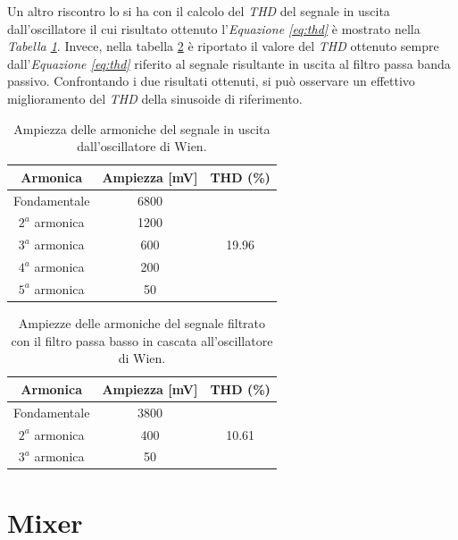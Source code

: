 \documentclass[titlepage]{report}
\begin{document}
	Un altro riscontro lo si ha con il calcolo del \textit{THD} del segnale in uscita dall'oscillatore il cui risultato ottenuto l'\textit{Equazione \ref{eq:thd}} è mostrato nella \textit{Tabella \ref{tab:THD_WIEN}}. Invece, nella tabella \ref{tab:THD_WIEN+LP} è riportato il valore del \textit{THD} ottenuto sempre dall'\textit{Equazione \ref{eq:thd}} riferito al segnale risultante in uscita al filtro passa banda passivo. 
	Confrontando i due risultati ottenuti, si può osservare un effettivo miglioramento del \textit{THD} della sinusoide di riferimento.

	\begin{table}[h!]
		\centering
		\begin{tabular}{||c|c|c||}
			\hline
			\cellcolor{gray!10}Armonica & \cellcolor{gray!10}Ampiezza [mV] & \cellcolor{gray!10}THD (\%) \\
			\hline
			Fondamentale & 6800 &\\
			\cline{1-2}
			$2^a$ armonica & 1200 & \\
			\cline{1-2} 
			$3^a$ armonica & 600 & 19.96 \\
			\cline{1-2} 
			$4^a$ armonica & 200 & \\
			\cline{1-2} 
			$5^a$ armonica & 50 & \\
			\hline	
		\end{tabular}
		\caption{Ampiezza delle armoniche del segnale in uscita dall'oscillatore di Wien.}
		\label{tab:THD_WIEN}
	\end{table}

	\begin{table}[h!]
		\centering
		\begin{tabular}{||c|c|c||}
			\hline
			\cellcolor{gray!10}Armonica & \cellcolor{gray!10}Ampiezza [mV] & \cellcolor{gray!10}THD (\%) \\
			\hline
			Fondamentale & 3800 &\\
			\cline{1-2}
			$2^a$ armonica & 400 & 10.61 \\
			\cline{1-2} 
			$3^a$ armonica & 50 & \\
			\hline	
		\end{tabular}
		\caption{Ampiezze delle armoniche del segnale filtrato con il filtro passa basso in cascata all'oscillatore di Wien.}
		\label{tab:THD_WIEN+LP}
	\end{table}

\section{Mixer}
\label{sec:Mixer}
\end{document}
